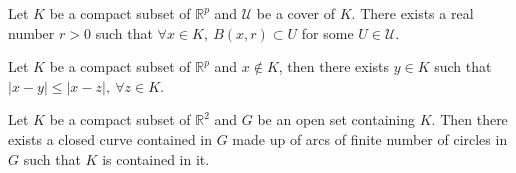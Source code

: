 	\begin{theorem}
		Let $K$ be a compact subset of $\mathbb{R}^p$ and $\mathcal{U}$ be a cover of $K$. There exists a real number $r > 0$ such that $\forall x \in K,\ B(x,r) \subset U$ for some $U \in \mathcal{U}$.
	\end{theorem}

	\begin{theorem}
		Let $K$ be a compact subset of $\mathbb{R}^p$ and $x \not\in K$, then there exists $y \in K$ such that $|x-y| \le |x-z|,\ \forall z \in K$.
	\end{theorem}

	\begin{theorem}
		Let $K$ be a compact subset of $\mathbb{R}^2$ and $G$ be an open set containing $K$. Then there exists a closed curve contained in $G$ made up of arcs of finite number of circles in $G$ such that $K$ is contained in it. 
	\end{theorem}

